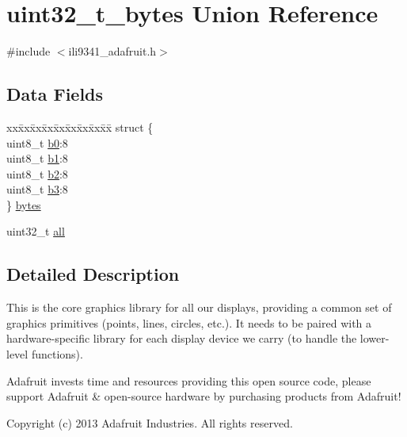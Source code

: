 \hypertarget{unionuint32__t__bytes}{\section{uint32\-\_\-t\-\_\-bytes Union Reference}
\label{unionuint32__t__bytes}
}


{\ttfamily \#include $<$ili9341\-\_\-adafruit.\-h$>$}

\subsection*{Data Fields}
\begin{DoxyCompactItemize}
\item 
\begin{tabbing}
xx\=xx\=xx\=xx\=xx\=xx\=xx\=xx\=xx\=\kill
struct \{\\
\>uint8\_t \hyperlink{unionuint32__t__bytes_a92b86537decb69327191d870f41c60f7}{b0}:8\\
\>uint8\_t \hyperlink{unionuint32__t__bytes_a91fb31482a2ce44b454fca964dcd556b}{b1}:8\\
\>uint8\_t \hyperlink{unionuint32__t__bytes_a462312b99de0c6d1c497064902196e1d}{b2}:8\\
\>uint8\_t \hyperlink{unionuint32__t__bytes_abd7739cae59fab7cf712d53f337b378a}{b3}:8\\
\} \hyperlink{unionuint32__t__bytes_a50aeebe398ee3b740421f1cc8d8583b8}{bytes}\\

\end{tabbing}\item 
uint32\-\_\-t \hyperlink{unionuint32__t__bytes_a83b0c87830b60d185365dbadf8efd4a0}{all}
\end{DoxyCompactItemize}


\subsection{Detailed Description}
This is the core graphics library for all our displays, providing a common set of graphics primitives (points, lines, circles, etc.). It needs to be paired with a hardware-\/specific library for each display device we carry (to handle the lower-\/level functions).

Adafruit invests time and resources providing this open source code, please support Adafruit \& open-\/source hardware by purchasing products from Adafruit!

Copyright (c) 2013 Adafruit Industries. All rights reserved.

